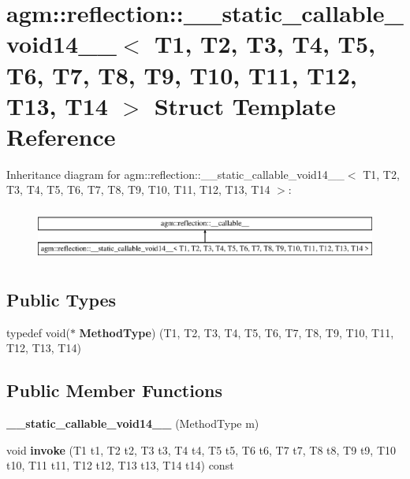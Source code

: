 \hypertarget{structagm_1_1reflection_1_1____static__callable__void14____}{}\section{agm\+:\+:reflection\+:\+:\+\_\+\+\_\+static\+\_\+callable\+\_\+void14\+\_\+\+\_\+$<$ T1, T2, T3, T4, T5, T6, T7, T8, T9, T10, T11, T12, T13, T14 $>$ Struct Template Reference}
\label{structagm_1_1reflection_1_1____static__callable__void14____}
Inheritance diagram for agm\+:\+:reflection\+:\+:\+\_\+\+\_\+static\+\_\+callable\+\_\+void14\+\_\+\+\_\+$<$ T1, T2, T3, T4, T5, T6, T7, T8, T9, T10, T11, T12, T13, T14 $>$\+:\begin{figure}[H]
\begin{center}
\leavevmode
\includegraphics[height=1.769352cm]{structagm_1_1reflection_1_1____static__callable__void14____}
\end{center}
\end{figure}
\subsection*{Public Types}
\begin{DoxyCompactItemize}
\item 
typedef void($\ast$ {\bfseries Method\+Type}) (T1, T2, T3, T4, T5, T6, T7, T8, T9, T10, T11, T12, T13, T14)\hypertarget{structagm_1_1reflection_1_1____static__callable__void14_____a8e1696b30a01938ef2fd151526bf2769}{}\label{structagm_1_1reflection_1_1____static__callable__void14_____a8e1696b30a01938ef2fd151526bf2769}

\end{DoxyCompactItemize}
\subsection*{Public Member Functions}
\begin{DoxyCompactItemize}
\item 
{\bfseries \+\_\+\+\_\+static\+\_\+callable\+\_\+void14\+\_\+\+\_\+} (Method\+Type m)\hypertarget{structagm_1_1reflection_1_1____static__callable__void14_____aac05f541e087ed7124db7d568733e1e5}{}\label{structagm_1_1reflection_1_1____static__callable__void14_____aac05f541e087ed7124db7d568733e1e5}

\item 
void {\bfseries invoke} (T1 t1, T2 t2, T3 t3, T4 t4, T5 t5, T6 t6, T7 t7, T8 t8, T9 t9, T10 t10, T11 t11, T12 t12, T13 t13, T14 t14) const \hypertarget{structagm_1_1reflection_1_1____static__callable__void14_____a6ae6bd7c3cd779290f1873a5d53e87cd}{}\label{structagm_1_1reflection_1_1____static__callable__void14_____a6ae6bd7c3cd779290f1873a5d53e87cd}

\end{DoxyCompactItemize}
